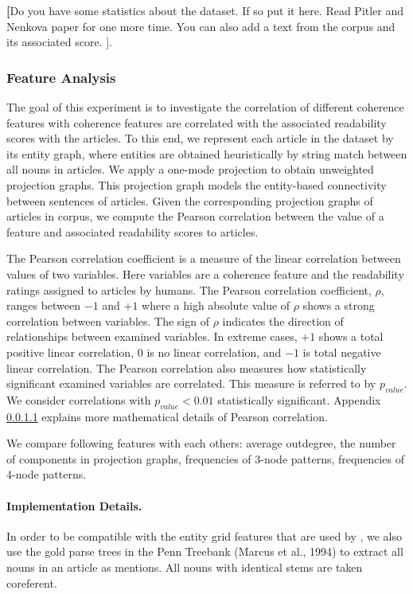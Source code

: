 \textbf[Do you have some statistics about the dataset. If so put it here. Read Pitler and Nenkova paper for one more time. You can also add a text from the corpus and its associated score. ].



\subsubsection{Feature Analysis}
\label{subsubsec:feature_analysis}
%
The goal of this experiment is to investigate the correlation of different coherence features with coherence features are correlated with the associated readability scores with the articles. 
To this end, we represent each article in the dataset by its entity graph, where entities are obtained heuristically by string match between all nouns in articles. 
We apply a one-mode projection to obtain unweighted projection graphs. 
This projection graph models the entity-based connectivity between sentences of articles. 
Given the corresponding projection graphs of articles in corpus, we compute the Pearson correlation between the value of a feature and associated readability scores to articles. 

The Pearson correlation coefficient is a measure of the linear correlation between values of two variables. 
Here variables are a coherence feature and the readability ratings assigned to articles by humans. 
The Pearson correlation coefficient, $\rho$, ranges between $-1$ and $+1$ where a high absolute value of $\rho$ shows a strong correlation between variables. 
The sign of $\rho$ indicates the direction of relationships between examined variables. 
In extreme cases, $+1$ shows a total positive linear correlation, $0$ is no linear correlation, and $-1$ is total negative linear correlation. 
The Pearson correlation also measures how statistically significant examined variables are correlated. 
This measure is referred to by $p_{value}$. 
We consider correlations with $p_{value} < 0.01$ statistically significant. 
Appendix \ref{} explains more mathematical details of Pearson correlation.

We compare following features with each others: average outdegree, the number of components in projection graphs, frequencies of 3-node patterns, frequencies of 4-node patterns. 



\paragraph{Implementation Details.} In order to be compatible with the entity grid features that are used by , we also use the gold parse trees in the Penn Treebank (Marcus et al., 1994) to extract all nouns in an  article as mentions. 
All nouns with identical stems are taken coreferent. 

